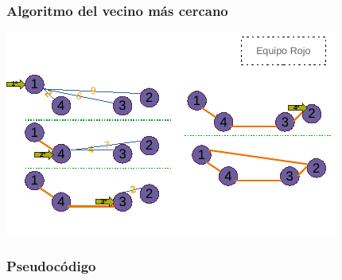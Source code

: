 \documentclass[13pt]{beamer}
\begin{document}
    \begin{frame}
		\frametitle{Algoritmo del vecino más cercano}
		\begin{center}
			\includegraphics[scale=1.5]{./img/DibVecCercano.pdf}
		\end{center}
	\end{frame}

	\begin{frame}
		\frametitle{Pseudocódigo}
		\begin{center}
		\end{center}
	\end{frame}
\end{document}
